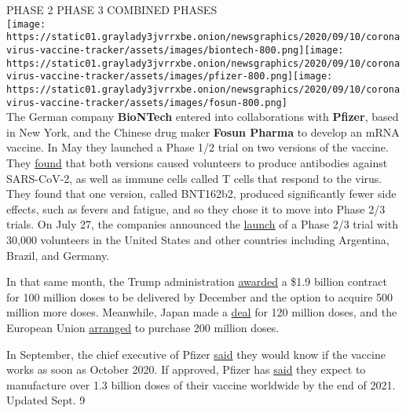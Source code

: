 PHASE 2 PHASE 3 COMBINED PHASES\\
\texttt{[image: https://static01.graylady3jvrrxbe.onion/newsgraphics/2020/09/10/coronavirus-vaccine-tracker/assets/images/biontech-800.png]}\texttt{[image: https://static01.graylady3jvrrxbe.onion/newsgraphics/2020/09/10/coronavirus-vaccine-tracker/assets/images/pfizer-800.png]}\texttt{[image: https://static01.graylady3jvrrxbe.onion/newsgraphics/2020/09/10/coronavirus-vaccine-tracker/assets/images/fosun-800.png]}\\
The German company \textbf{\textbf{BioNTech}} entered into
collaborations with \textbf{\textbf{Pfizer}}, based in New York, and the
Chinese drug maker \textbf{\textbf{Fosun Pharma}} to develop an mRNA
vaccine. In May they launched a Phase 1/2 trial on two versions of the
vaccine. They \href{https://doi.org/10.1101/2020.08.17.20176651}{found}
that both versions caused volunteers to produce antibodies against
SARS-CoV-2, as well as immune cells called T cells that respond to the
virus. They found that one version, called BNT162b2, produced
significantly fewer side effects, such as fevers and fatigue, and so
they chose it to move into Phase 2/3 trials. On July 27, the companies
announced the
\href{https://www.businesswire.com/news/home/20200727005800/en/Pfizer-BioNTech-Choose-Lead-mRNA-Vaccine-Candidate}{launch}
of a Phase 2/3 trial with 30,000 volunteers in the United States and
other countries including Argentina, Brazil, and Germany.

In that same month, the Trump administration
\href{https://www.nytimes3xbfgragh.onion/2020/07/22/us/politics/pfizer-coronavirus-vaccine.html}{awarded}
a \$1.9 billion contract for 100 million doses to be delivered by
December and the option to acquire 500 million more doses. Meanwhile,
Japan made a
\href{https://www.pfizer.com/news/press-release/press-release-detail/pfizer-and-biontech-supply-japan-120-million-doses-their}{deal}
for 120 million doses, and the European Union
\href{https://www.pfizer.com/news/press-release/press-release-detail/pfizer-and-biontech-potentially-supply-eu-200-million-doses}{arranged}
to purchase 200 million doses.

In September, the chief executive of Pfizer
\href{https://www.nytimes3xbfgragh.onion/reuters/2020/09/03/world/europe/03reuters-health-coronavirus-drugs.html}{said}
they would know if the vaccine works as soon as October 2020. If
approved, Pfizer has
\href{https://www.pfizer.com/news/press-release/press-release-detail/pfizer-and-biontech-supply-canada-their-bnt162-mrna-based}{said}
they expect to manufacture over 1.3 billion doses of their vaccine
worldwide by the end of 2021.\\
Updated Sept. 9

